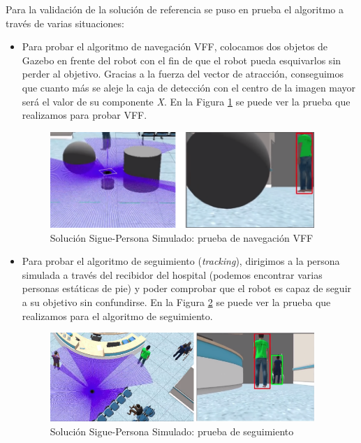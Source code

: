 Para la validación de la solución de referencia se puso en prueba el algoritmo a través de varias situaciones:\\

\begin{itemize}
	\item Para probar el algoritmo de navegación VFF, colocamos dos objetos de Gazebo en frente del robot con el fin de que el robot pueda esquivarlos sin perder al objetivo. Gracias a la fuerza del vector de atracción, conseguimos que cuanto más se aleje la caja de detección con el centro de la imagen mayor será el valor de su componente \textit{X}. En la Figura \ref{fig:sim_solucion_vff_test} se puede ver la prueba que realizamos para probar VFF.
	
	\begin{figure} [H]
		\begin{center}
		\includegraphics[width=10cm]{imagenes/cap6/sim-solution-vff-test.png}
		\end{center}
		\caption[Solución Sigue-Persona Simulado: prueba de navegación VFF]{Solución Sigue-Persona Simulado: prueba de navegación VFF}
		\label{fig:sim_solucion_vff_test}
	\end{figure}

	\item Para probar el algoritmo de seguimiento (\textit{tracking}), dirigimos a la persona simulada a través del recibidor del hospital (podemos encontrar varias personas estáticas de pie) y poder comprobar que el robot es capaz de seguir a su objetivo sin confundirse. En la Figura \ref{fig:sim_solucion_tracking_test} se puede ver la prueba que realizamos para el algoritmo de seguimiento.

	\begin{figure} [H]
		\begin{center}
		\includegraphics[width=10cm]{imagenes/cap6/sim-solution-tracking-test.png}
		\end{center}
		\caption[Solución Sigue-Persona Simulado: prueba de seguimiento]{Solución Sigue-Persona Simulado: prueba de seguimiento}
		\label{fig:sim_solucion_tracking_test}
	\end{figure}
\end{itemize}\

